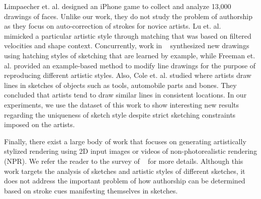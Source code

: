 Limpaecher et. al.  designed an iPhone game to collect and analyze 13,000 drawings of faces. Unlike our work, they do not study the problem of authorship as they focus on auto-correction of strokes for novice artists. Lu et. al. ~\cite{Lu:2012:HES} mimicked a particular artistic style through matching that was based on filtered velocities and shape context. Concurrently, work in ~\cite{Kalogerakis:2012:mlhatching} synthesized new drawings using hatching styles of sketching that are learned by example, while Freeman et. al.  provided an example-based method to modify line drawings for the purpose of reproducing different artistic styles. Also, Cole et. al.  studied where artists draw lines in sketches of objects such as tools, automobile parts and bones. They concluded that artists tend to draw similar lines in consistent locations. In our experiments, we use the dataset of this work to show interesting new results regarding the uniqueness of sketch style despite strict sketching constraints imposed on the artists.

Finally, there exist a large body of work that focuses on generating artistically stylized rendering using 2D input images or videos of non-photorealistic rendering (NPR). We refer the reader to the survey of ~\cite{Kyprianidis:2013:TAS} for more details. Although this work targets the analysis of sketches and artistic styles of different sketches, it does not address the important problem of how authorship can be determined based on stroke cues manifesting themselves in sketches. %

\vspace{-2mm}
